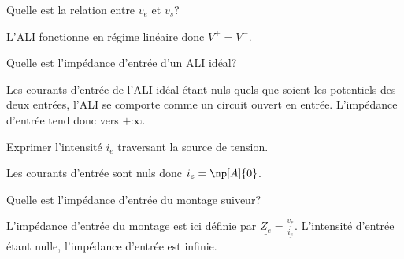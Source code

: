 \debutEntrainement



\begin{enonce}
  Quelle est la relation entre \(v_{e}\) et \(v_{s}\)?
\end{enonce}
\begin{corrige}
  L’ALI fonctionne en régime linéaire donc \(V^{+} = V^{-}\).
\end{corrige}




\begin{enonce}
  Quelle est l’impédance d’entrée d’un ALI idéal?
\end{enonce}

\reponse{$\infty$}
\begin{corrige}
  Les courants d’entrée de l’ALI idéal étant nuls quels que soient les potentiels des deux entrées, l’ALI se comporte comme un circuit ouvert en entrée. L’impédance d’entrée tend donc vers \(+\infty\).
\end{corrige}




\begin{enonce}
  Exprimer l’intensité \(i_{e}\) traversant la source de tension.
\end{enonce}
\begin{corrige}
  Les courants d’entrée sont nuls donc \(i_{e} = \np[A]{0}\).
\end{corrige}




\begin{enonce}
  Quelle est l’impédance d’entrée du montage suiveur?
\end{enonce}
\reponse{\(\infty\)}
\begin{corrige}
  L’impédance d’entrée du montage est ici définie par \(\underline{Z_{e}} = \frac{\underline{v_{e}}}{\underline{i_{e}}}\). L’intensité d’entrée étant nulle, l’impédance d’entrée est infinie.
\end{corrige}

